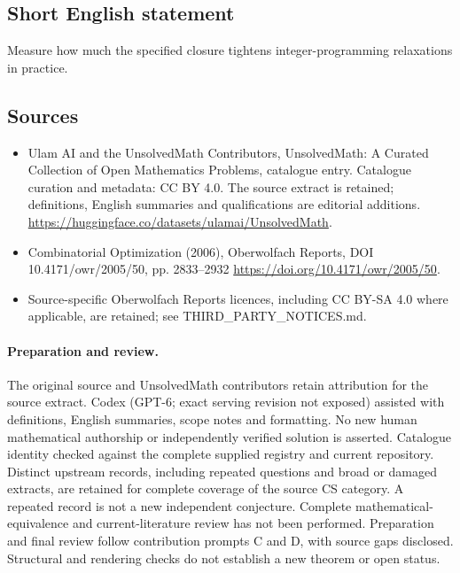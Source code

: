 \documentclass[11pt]{article}
\begin{document}
\subsection{Short English statement}
Measure how much the specified closure tightens integer-programming relaxations in practice.
\subsection{Sources}
\begin{itemize}
\item[\hypertarget{source:statement:1}{S1}] Ulam AI and the UnsolvedMath Contributors, UnsolvedMath: A Curated Collection of Open Mathematics Problems, catalogue entry. Catalogue curation and metadata: CC BY 4.0. The source extract is retained; definitions, English summaries and qualifications are editorial additions.
\url{https://huggingface.co/datasets/ulamai/UnsolvedMath}.
\item[\hypertarget{source:statement:2}{S2}] Combinatorial Optimization (2006), Oberwolfach Reports, DOI 10.4171/owr/2005/50, pp. 2833--2932
\url{https://doi.org/10.4171/owr/2005/50}.
\item Source-specific Oberwolfach Reports licences, including CC BY-SA 4.0 where applicable, are retained; see THIRD\_PARTY\_NOTICES.md.
\end{itemize}
\paragraph{Preparation and review.}
The original source and UnsolvedMath contributors retain attribution for the source extract. Codex (GPT-6; exact serving revision not exposed) assisted with definitions, English summaries, scope notes and formatting. No new human mathematical authorship or independently verified solution is asserted. Catalogue identity checked against the complete supplied registry and current repository. Distinct upstream records, including repeated questions and broad or damaged extracts, are retained for complete coverage of the source CS category. A repeated record is not a new independent conjecture. Complete mathematical-equivalence and current-literature review has not been performed. Preparation and final review follow contribution prompts C and D, with source gaps disclosed. Structural and rendering checks do not establish a new theorem or open status.
\label{end:statement}
\end{document}
